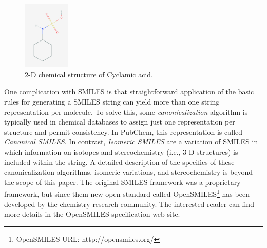 \begin{figure}[htb]
        \centering
        \includegraphics[width=0.20\textwidth]{figures/cyclamic_acid.png}
        \caption{2-D chemical structure of Cyclamic acid.}
        \label{fig:cyclamic}
    \end{figure}
    
One complication with SMILES is that straightforward application of the basic rules for generating a SMILES string can yield more than one string representation per molecule. To solve this, some {\em canonicalization} algorithm is typically used in chemical databases to  assign just one representation per structure and permit consistency. In PubChem, this representation is called {\em Canonical SMILES}. In contrast, 
{\em Isomeric SMILES} are a variation of SMILES in which information on isotopes and stereochemistry (i.e., 3-D structures) is included within the string. A detailed description of the specifics of these canonicalization algorithms, isomeric variations, and stereochemistry is beyond the scope of this paper. The original SMILES framework was a proprietary framework, but since them new open-standard called OpenSMILES\footnote{OpenSMILES URL: http://opensmiles.org/} has been developed by the chemistry research community. The interested reader can find more details in the OpenSMILES specification web site. 
%

